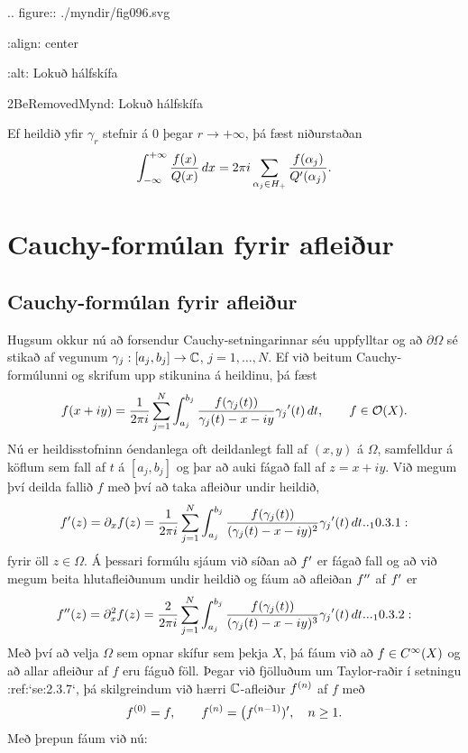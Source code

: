.. figure:: ./myndir/fig096.svg

    :align: center

    :alt: Lokuð hálfskífa

    2BeRemovedMynd: Lokuð hálfskífa


\noindent
Ef heildið yfir ${\gamma}_r$ stefnir á $0$ þegar $r\to+{\infty}$,  
þá fæst niðurstaðan
 $$\int_{-\infty}\sp {+\infty} \dfrac {f(x)}{Q(x)}\, dx=
2\pi i\sum_{\alpha_j\in H_+} \dfrac{f(\alpha_j)}{Q{\sp{\prime}}(\alpha_j)}.
 $$

\section{Cauchy-formúlan fyrir afleiður}



\subsection*{Cauchy-formúlan fyrir afleiður}

Hugsum okkur nú að forsendur Cauchy-setningarinnar séu uppfylltar og
að $\partial\Omega$ sé stikað af vegunum
$\gamma_j:[a_j,b_j]\to {\mathbb C}$, $j=1,\dots,N$.  Ef við beitum
Cauchy-formúlunni og skrifum upp stikunina á heildinu, þá fæst
 $$f(x+iy)=\dfrac 1{2\pi i}\sum_{j=1}\sp N \int_{a_j}\sp {b_j}
\dfrac {f(\gamma_j(t))}{\gamma_j(t)-x-iy}\gamma_j{\sp{\prime}}(t)\, dt, 
\qquad f\in {\cal O}(X).
 $$
Nú er heildisstofninn óendanlega oft deildanlegt fall af $(x,y)$ á
$\Omega$, samfelldur á köflum sem fall af $t$ á $[a_j,b_j]$ og þar að
auki fágað fall af $z=x+iy$.  Við
megum því deilda fallið $f$ með því að taka afleiður undir heildið,
 \begin{equation*}f\dash(z)=\partial_xf(z)=
\dfrac 1{2\pi i}\sum_{j=1}\sp N \int_{a_j}\sp {b_j}
\dfrac {f(\gamma_j(t))}{(\gamma_j(t)-x-iy)\sp 2}\gamma_j\dash(t)\, dt


.. _10.3.1:

 \end{equation*}
fyrir öll $z\in \Omega$.  {Á} þessari formúlu sjáum við síðan að
$f{\sp{\prime}}$ er fágað fall og að við megum beita hlutafleiðunum undir
heildið og fáum að afleiðan $f{\sp{\prime\prime}}$ af $f{\sp{\prime}}$ er
 \begin{equation*}f\ddash(z)=\partial_x\sp 2f(z)=
\dfrac 2{2\pi i}\sum_{j=1}\sp N \int_{a_j}\sp {b_j}
\dfrac {f(\gamma_j(t))}{(\gamma_j(t)-x-iy)\sp 3}\gamma_j\dash(t)\, dt.


.. _10.3.2:

 \end{equation*}
Með því að velja $\Omega$ sem opnar skífur sem þekja $X$, þá fáum við
að $f\in C\sp{\infty}(X)$ og að allar afleiður af $f$ eru fáguð
föll.  Þegar við fjölluðum um Taylor-raðir í setningu
:ref:`se:2.3.7`, þá skilgreindum við  hærri ${\mathbb C}$-afleiður $f\sp{(n)}$ af $f$ með
 $$f\sp{(0)}=f, \qquad f\sp{(n)}=\big(f\sp{(n-1)}){\sp{\prime}}, \quad n\geq 1.
 $$
Með þrepun fáum við nú:

